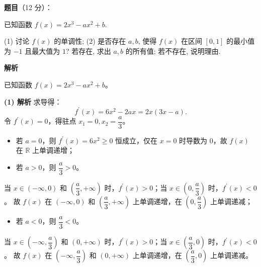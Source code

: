 \begin{answer}

\textbf{题目}（12 分）：

已知函数 $f(x) = 2x^3 - ax^2 + b$.

(1) 讨论 $f(x)$ 的单调性;  
(2) 是否存在 $a, b$, 使得 $f(x)$ 在区间 $[0, 1]$ 的最小值为 $-1$ 且最大值为 $1$? 若存在, 求出 $a, b$ 的所有值; 若不存在, 说明理由.

\textbf{解析}

已知函数 $f(x) = 2x^3 - ax^2 + b$。

\textbf{(1) 解析}
求导得：
\nopagebreak[4]
\[f^\prime(x) = 6x^2 - 2ax = 2x(3x - a).\]
令 $f^\prime(x) = 0$，得驻点 $x_1 = 0, x_2 = \dfrac{a}{3}$。
\begin{itemize}
\item 若 $a = 0$，则 $f^\prime(x) = 6x^2 \geqslant 0$ 恒成立，仅在 $x = 0$ 时导数为 0，故 $f(x)$ 在 $\mathbb{R}$ 上单调递增；
\item 若 $a > 0$，则 $\dfrac{a}{3} > 0$。
\end{itemize}
  当 $x \in (-\infty, 0)$ 和 $\left(\dfrac{a}{3}, +\infty\right)$ 时，$f^\prime(x) > 0$；当 $x \in \left(0, \dfrac{a}{3}\right)$ 时，$f^\prime(x) < 0$。
  故 $f(x)$ 在 $(-\infty, 0)$ 和 $\left(\dfrac{a}{3}, +\infty\right)$ 上单调递增，在 $\left(0, \dfrac{a}{3}\right)$ 上单调递减；
\begin{itemize}
\item 若 $a < 0$，则 $\dfrac{a}{3} < 0$。
\end{itemize}
  当 $x \in \left(-\infty, \dfrac{a}{3}\right)$ 和 $(0, +\infty)$ 时，$f^\prime(x) > 0$；当 $x \in \left(\dfrac{a}{3}, 0\right)$ 时，$f^\prime(x) < 0$。
  故 $f(x)$ 在 $\left(-\infty, \dfrac{a}{3}\right)$ 和 $(0, +\infty)$ 上单调递增，在 $\left(\dfrac{a}{3}, 0\right)$ 上单调递减。


\end{answer}
